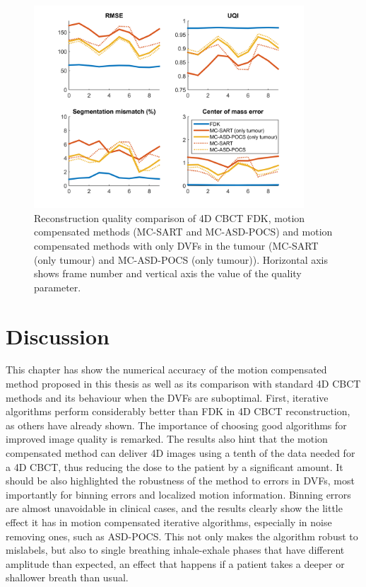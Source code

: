 \begin{figure}
\begin{center}

\includegraphics[width=0.9\textwidth]{accuracyMC/tumourMCCBCTparams.png} 


\end{center}

\caption[Reconstruction quality comparison of motion compensation]{\label{fig:tumourMCCBCTquality}  Reconstruction quality comparison of 4D CBCT FDK, motion compensated methods (MC-SART and MC-ASD-POCS) and motion compensated methods with only DVFs in the tumour (MC-SART (only tumour) and MC-ASD-POCS (only tumour)). Horizontal axis shows frame number and vertical axis the value of the quality parameter.} 
\end{figure}

\FloatBarrier
\section{Discussion}

This chapter has show the numerical accuracy of the motion compensated method proposed in this thesis as well as its comparison with standard 4D CBCT methods and its behaviour when the DVFs are suboptimal. First, iterative algorithms perform considerably better than FDK in 4D CBCT reconstruction, as others have already shown. The importance of choosing good algorithms for improved image quality is remarked. The results also hint that the motion compensated method can deliver 4D images using a tenth of the data needed for a 4D CBCT, thus reducing the dose to the patient by a significant amount. It should be also highlighted the robustness of the method to errors in DVFs, most importantly for binning errors and localized motion information. Binning errors are almost unavoidable in clinical cases, and the results clearly show the little effect it has in motion compensated iterative algorithms, especially in noise removing ones, such as ASD-POCS. This not only makes the algorithm robust to mislabels, but also to single breathing inhale-exhale phases that have different amplitude than expected, an effect that happens if a patient takes a deeper or shallower breath than usual. 

